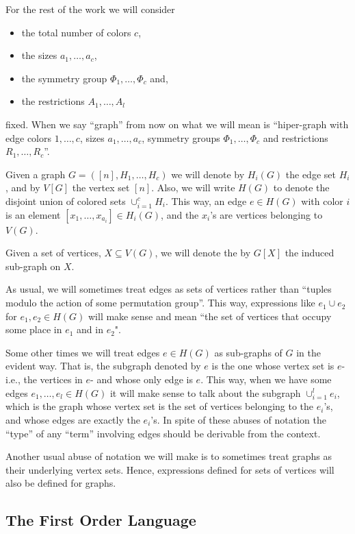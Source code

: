 \documentclass[11pt,notitlepage]{report}
\theoremstyle{definition}
\begin{document}
For the rest of the work we will consider 
\begin{itemize}
	\item the total number of colors $c$,	
	\item the sizes $a_1,\dots,a_c$,
	\item the symmetry group $\Phi_1,\dots, \Phi_c$ and,
	\item the restrictions $A_1,\dots,A_l$
\end{itemize}
fixed. When we say ``graph'' from now on what
we will mean is ``hiper-graph with edge colors 
$1,\dots, c$, sizes $a_1,\dots,a_c$, 
symmetry groups $\Phi_1,\dots,\Phi_c$ and 
restrictions $R_1,\dots,R_c$''. \par

Given a graph $G=([n], H_1,\dots, H_c)$ we will denote by
$H_i(G)$ the edge set $H_i$, and by $V[G]$ the vertex set
$[n]$. Also, we will write $H(G)$ to denote the 
disjoint union of colored sets $\cup_{i=1}^c H_i$.
This way, an edge $e\in H(G)$ with color $i$ is an element
$[x_1,\dots,x_{a_i}]\in H_i(G)$, and the $x_i$'s are vertices
belonging to $V(G)$. \par
Given a set of vertices, $X\subseteq V(G)$, we will denote
the by $G[X]$ the induced sub-graph on $X$. \par
As usual, we will sometimes treat edges as sets of vertices
rather than ``tuples modulo the action of some permutation group''. 
This way, expressions like $e_1\cup e_2$ for $e_1, e_2\in H(G)$
will make sense and mean 
``the set of vertices that occupy some place in $e_1$ 
and in $e_2$".\par
Some other times we will treat edges $e\in H(G)$
as sub-graphs of $G$ in the evident way. That is, the subgraph
denoted by $e$ is the one whose vertex set is $e$-i.e., the vertices in $e$-
and whose only edge is $e$. 
This way, when we have some edges $e_1,\dots, e_l\in H(G)$ 
it will make sense to talk
about the subgraph $\cup_{i=1}^l e_i$, which is the graph
whose vertex set is the set of vertices belonging to the $e_i$'s, 
and whose edges are exactly the $e_i$'s. In spite of these
abuses of notation the ``type'' of any ``term'' involving edges 
should be derivable from the context. \par
Another usual abuse of notation we will make is to sometimes
treat graphs as their underlying vertex sets. Hence,
expressions defined for sets of vertices will also be defined 
for graphs. 

\subsection{The First Order Language}
\end{document}
